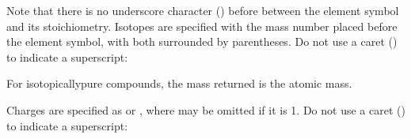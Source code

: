 \documentclass[letterpaper,10pt,english]{sphinxmanual}
\begin{document}
Note that there is no underscore character (\sphinxcode{\sphinxupquote{\_}}) before between the element
symbol and its stoichiometry. Isotopes are specified with the mass number
placed before the element symbol, with both surrounded by parentheses. Do not
use a caret (\sphinxcode{\sphinxupquote{\textasciicircum{}}}) to indicate a superscript:

\begin{sphinxVerbatim}[commandchars=\\\{\}]
 \PYG{p}{[}\PYG{p}{]}   

 \PYG{p}{[}\PYG{p}{]} 

 \PYG{p}{[}\PYG{p}{]} 

 \PYG{p}{[}\PYG{p}{]}   

 \PYG{p}{[}\PYG{p}{]} 
\end{sphinxVerbatim}

For isotopically\sphinxhyphen{}pure compounds, the mass returned is the atomic mass.

Charges are specified as  or , where  may be omitted if it is 1.
Do not use a caret (\sphinxcode{\sphinxupquote{\textasciicircum{}}}) to indicate a superscript:
\end{document}
